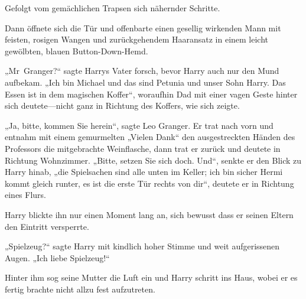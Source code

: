 Gefolgt vom gemächlichen Trapsen sich nähernder Schritte.

Dann öffnete sich die Tür und offenbarte einen gesellig wirkenden Mann mit feisten, rosigen Wangen und zurückgehendem Haaransatz in einem leicht gewölbten, blauen Button-Down-Hemd.

„Mr~Granger?“ sagte Harrys Vater forsch, bevor Harry auch nur den Mund aufbekam. „Ich bin Michael und das sind Petunia und unser Sohn Harry. Das Essen ist in dem magischen Koffer“, woraufhin Dad mit einer vagen Geste hinter sich deutete—nicht ganz in Richtung des Koffers, wie sich zeigte.

„Ja, bitte, kommen Sie herein“, sagte Leo Granger. Er trat nach vorn und entnahm mit einem gemurmelten „Vielen Dank“ den ausgestreckten Händen des Professors die mitgebrachte Weinflasche, dann trat er zurück und deutete in Richtung Wohnzimmer. „Bitte, setzen Sie sich doch. Und“, senkte er den Blick zu Harry hinab, „die Spielsachen sind alle unten im Keller; ich bin sicher Hermi kommt gleich runter, es ist die erste Tür rechts von dir“, deutete er in Richtung eines Flurs.

Harry blickte ihn nur einen Moment lang an, sich bewusst dass er seinen Eltern den Eintritt versperrte.

„Spielzeug?“ sagte Harry mit kindlich hoher Stimme und weit aufgerissenen Augen. „Ich liebe Spielzeug!“

Hinter ihm sog seine Mutter die Luft ein und Harry schritt ins Haus, wobei er es fertig brachte nicht allzu fest aufzutreten.


